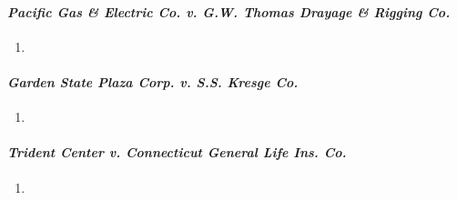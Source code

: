 \paragraph{\emph{Pacific Gas \& Electric Co. v. G.W. Thomas Drayage \& Rigging 
Co.}}

\begin{enumerate}
    \item %
\end{enumerate}

\paragraph{\emph{Garden State Plaza Corp. v. S.S. Kresge Co.}}

\begin{enumerate}
    \item %
\end{enumerate}

\paragraph{\emph{Trident Center v. Connecticut General Life Ins. Co.}}

\begin{enumerate}
    \item %
\end{enumerate}



